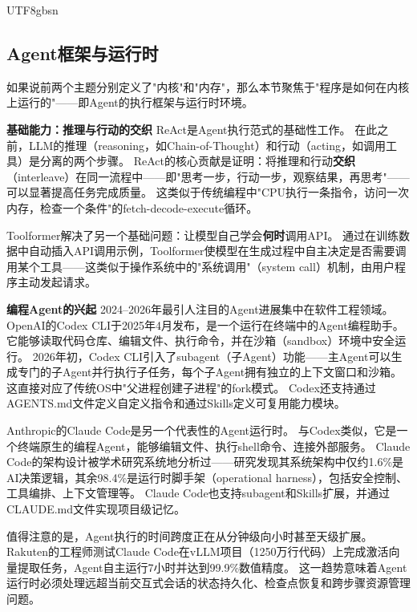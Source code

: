 \documentclass[11pt,a4paper]{article}
\begin{document}
\begin{CJK*}{UTF8}{gbsn}
\subsection{Agent框架与运行时}
\label{sec:related-agent-framework}

如果说前两个主题分别定义了"内核"和"内存"，那么本节聚焦于"程序是如何在内核上运行的"——即Agent的执行框架与运行时环境。

\textbf{基础能力：推理与行动的交织}
ReAct\cite{yao2023react}是Agent执行范式的基础性工作。
在此之前，LLM的推理（reasoning，如Chain-of-Thought）和行动（acting，如调用工具）是分离的两个步骤。
ReAct的核心贡献是证明：将推理和行动\textbf{交织}（interleave）在同一流程中——即"思考一步，行动一步，观察结果，再思考"——可以显著提高任务完成质量。
这类似于传统编程中"CPU执行一条指令，访问一次内存，检查一个条件"的fetch-decode-execute循环。

Toolformer\cite{schick2023toolformer}解决了另一个基础问题：让模型自己学会\textbf{何时}调用API。
通过在训练数据中自动插入API调用示例，Toolformer使模型在生成过程中自主决定是否需要调用某个工具——这类似于操作系统中的"系统调用"（system call）机制，由用户程序主动发起请求。

\textbf{编程Agent的兴起}
2024--2026年最引人注目的Agent进展集中在软件工程领域。
OpenAI的Codex CLI\cite{openai_codex_overview_2026}于2025年4月发布，是一个运行在终端中的Agent编程助手。
它能够读取代码仓库、编辑文件、执行命令，并在沙箱（sandbox）环境中安全运行\cite{openai_codex_sandbox_2026}。
2026年初，Codex CLI引入了subagent（子Agent）功能\cite{openai_codex_subagents_2026}——主Agent可以生成专门的子Agent并行执行子任务，每个子Agent拥有独立的上下文窗口和沙箱。
这直接对应了传统OS中"父进程创建子进程"的fork模式。
Codex还支持通过AGENTS.md文件定义自定义指令\cite{openai_codex_agents_md_2026}和通过Skills定义可复用能力模块\cite{openai_codex_skills_2026}。

Anthropic的Claude Code\cite{anthropic_claudecode_overview_2026}是另一个代表性的Agent运行时。
与Codex类似，它是一个终端原生的编程Agent，能够编辑文件、执行shell命令、连接外部服务。
Claude Code的架构设计被学术研究系统地分析过\cite{dive_claudecode_2026}——研究发现其系统架构中仅约1.6\%是AI决策逻辑，其余98.4\%是运行时脚手架（operational harness），包括安全控制、工具编排、上下文管理等。
Claude Code也支持subagent\cite{anthropic_claudecode_subagents_2026}和Skills\cite{anthropic_claudecode_skills_2026}扩展，并通过CLAUDE.md文件实现项目级记忆\cite{anthropic_claudecode_memory_2026}。

值得注意的是，Agent执行的时间跨度正在从分钟级向小时甚至天级扩展。
Rakuten的工程师测试Claude Code在vLLM项目（1250万行代码）上完成激活向量提取任务，Agent自主运行7小时并达到99.9\%数值精度\cite{anthropic2026agenticreport}。
这一趋势意味着Agent运行时必须处理远超当前交互式会话的状态持久化、检查点恢复和跨步骤资源管理问题。


\end{CJK*}
\end{document}
